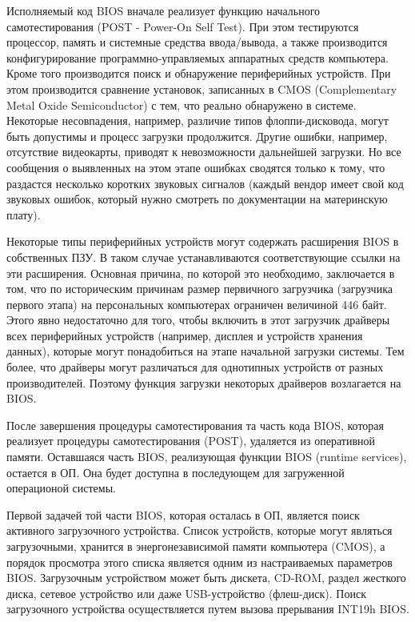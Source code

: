 Исполняемый код BIOS вначале реализует функцию начального самотестирования (POST - Power-On Self Test). При этом тестируются процессор, память и системные средства ввода/вывода, а также производится конфигурирование программно-управляемых аппаратных средств компьютера. Кроме того производится поиск и обнаружение периферийных устройств. При этом производится сравнение установок, записанных в CMOS (Complementary Metal Oxide Semiconductor) с тем, что реально обнаружено в системе. Некоторые несовпадения, например, различие типов флоппи-дисковода, могут быть допустимы и процесс загрузки продолжится. Другие ошибки, например, отсутствие видеокарты, приводят к невозможности дальнейшей загрузки. Но все сообщения о выявленных на этом этапе ошибках сводятся только к тому, что раздастся несколько коротких звуковых сигналов (каждый вендор имеет свой код звуковых ошибок, который нужно смотреть по документации на материнскую плату).

Некоторые типы периферийных устройств могут содержать расширения BIOS в собственных ПЗУ. В таком случае устанавливаются соответствующие ссылки на эти расширения. Основная причина, по которой это необходимо, заключается в том, что по историческим причинам размер первичного загрузчика (загрузчика первого этапа) на персональных компьютерах ограничен величиной 446 байт. Этого явно недостаточно для того, чтобы включить в этот загрузчик драйверы всех периферийных устройств (например, дисплея и устройств хранения данных), которые могут понадобиться на этапе начальной загрузки системы. Тем более, что драйверы могут различаться для однотипных устройств от разных производителей. Поэтому функция загрузки некоторых драйверов возлагается на BIOS.

После завершения процедуры самотестирования та часть кода BIOS, которая реализует процедуры самотестирования (POST), удаляется из оперативной памяти. Оставшаяся часть BIOS, реализующая функции BIOS (runtime services), остается в ОП. Она будет доступна в последующем для загруженной операционой системы.

Первой задачей той части BIOS, которая осталась в ОП, является поиск активного загрузочного устройства. Список устройств, которые могут являться загрузочными, хранится в энергонезависимой памяти компьютера (CMOS), а порядок просмотра этого списка является одним из настраиваемых параметров BIOS. Загрузочным устройством может быть дискета, CD-ROM, раздел жесткого диска, сетевое устройство или даже USB-устройство (флеш-диск). Поиск загрузочного устройства осуществляется путем вызова прерывания INT19h BIOS.

